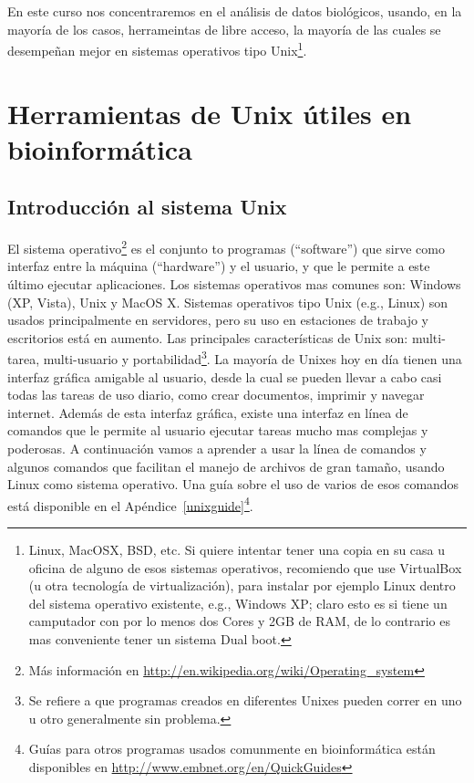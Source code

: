 \documentclass[letter,11pt]{book}
\begin{document}
En este curso nos concentraremos en el análisis de datos biológicos, usando, en la mayoría de los casos, herrameintas de libre acceso, la mayoría de las cuales se desempeñan mejor en sistemas operativos tipo Unix\footnote{Linux, MacOSX, BSD, etc. Si quiere intentar tener una copia en su casa u oficina de alguno de esos sistemas operativos, recomiendo que use VirtualBox (u otra tecnología de virtualización), para instalar por ejemplo Linux dentro del sistema operativo existente, e.g., Windows XP; claro esto es si tiene un camputador con por lo menos dos Cores y 2GB de RAM, de lo contrario es mas conveniente tener un sistema Dual boot.}.

\chapter{Herramientas de Unix útiles en bioinformática}
\section{Introducción al sistema Unix}

El sistema operativo\footnote{Más información en \url{http://en.wikipedia.org/wiki/Operating_system}} es el conjunto to programas (``software'') que sirve como interfaz entre la máquina (``hardware'') y el usuario, y que le permite a este último ejecutar aplicaciones. Los sistemas operativos mas comunes son: Windows (XP, Vista), Unix y MacOS X. Sistemas operativos tipo Unix (e.g., Linux) son usados principalmente en servidores, pero su uso en estaciones de trabajo y escritorios está en aumento.  Las principales características de Unix son: multi-tarea, multi-usuario y portabilidad\footnote{Se refiere a que programas creados en diferentes Unixes pueden correr en uno u otro generalmente sin problema.}. La mayoría de Unixes hoy en día tienen una interfaz gráfica amigable al usuario, desde la cual se pueden llevar a cabo casi todas las tareas de uso diario, como  crear documentos, imprimir y navegar internet. Además de esta interfaz gráfica, existe una interfaz en línea de comandos que le permite al usuario ejecutar tareas mucho mas complejas y poderosas. A continuación vamos a aprender a usar la línea de comandos y algunos comandos que facilitan el manejo de archivos de gran tamaño, usando Linux como sistema operativo. Una guía sobre el uso de varios de esos comandos está disponible en el Apéndice~\ref{unixguide}\footnote{Guías para otros programas usados comunmente en bioinformática están disponibles en \url{http://www.embnet.org/en/QuickGuides}}.
\end{document}
